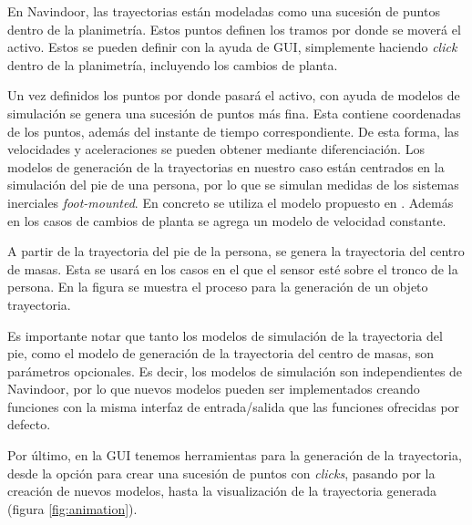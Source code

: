 En Navindoor, las trayectorias están modeladas como una sucesión de puntos dentro de la planimetría. Estos puntos definen los tramos por donde se moverá el activo. Estos se pueden definir con la ayuda de GUI, simplemente haciendo \emph{click} dentro de la planimetría, incluyendo los cambios de planta.

Un vez definidos los puntos por donde pasará el activo, con ayuda de modelos de simulación se genera una sucesión de puntos más fina. Esta contiene  coordenadas de los puntos, además del instante de tiempo correspondiente. De esta forma, las velocidades y aceleraciones se pueden obtener mediante diferenciación. Los modelos de generación de la trayectorias en nuestro caso están centrados en la simulación del pie de una persona, por lo que se simulan medidas de los sistemas inerciales \emph{foot-mounted}. En concreto se utiliza el modelo propuesto en . Además en los casos de cambios de planta se agrega un modelo de velocidad constante.

A partir de la  trayectoria del pie de la persona, se genera la trayectoria del centro de masas. Esta se usará en los casos en el que el sensor esté sobre el tronco de la persona. En la figura se muestra el proceso para la generación de un objeto trayectoria. 

Es importante notar que tanto los modelos de simulación de la trayectoria del pie, como el modelo de generación de la trayectoria del centro de masas, son parámetros opcionales. Es decir, los modelos de simulación son independientes de Navindoor, por lo que nuevos modelos pueden ser implementados creando funciones con la misma interfaz de entrada/salida que las funciones ofrecidas por defecto.

Por último, en la GUI tenemos herramientas para la generación de la trayectoria, desde la opción para crear una sucesión de puntos con \emph{clicks}, pasando por la creación de nuevos modelos, hasta la visualización de la trayectoria generada (figura \ref{fig:animation}).

